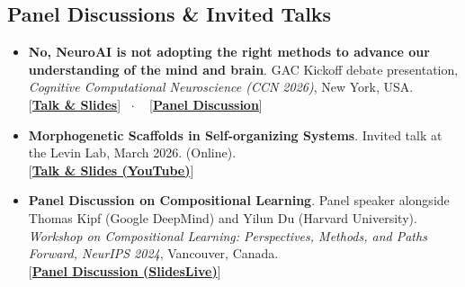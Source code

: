 \documentclass[10pt,a4paper]{article}
\newcommand{\linkbadge}[2]{%
  \textcolor{tagcolor}{[}\href{#2}{\textbf{#1}}\textcolor{tagcolor}{]}%
}
\begin{document}
\subsection*{Panel Discussions \& Invited Talks}
\begin{itemize}[leftmargin=1.6em, itemsep=0.35em]
    \item \textbf{No, NeuroAI is not adopting the right methods to advance our understanding of the mind and brain}. GAC Kickoff debate presentation, \textit{Cognitive Computational Neuroscience (CCN 2026)}, New York, USA. \\
    \linkbadge{Talk \& Slides}{https://youtu.be/kYESqAKLGhA?si=vNGPbsdhHVvX91J8&t=131} \ $\cdot$ \
    \linkbadge{Panel Discussion}{https://youtu.be/kYESqAKLGhA?si=8GGyCruh40tr0-QB&t=2514}

    \item \textbf{Morphogenetic Scaffolds in Self-organizing Systems}. Invited talk at the Levin Lab, March 2026. (Online). \\
    \linkbadge{Talk \& Slides (YouTube)}{https://youtu.be/X9dK7UKBICE?si=zwaakCn40DeKZKt0}

    \item \textbf{Panel Discussion on Compositional Learning}. Panel speaker alongside Thomas Kipf (Google DeepMind) and Yilun Du (Harvard University). \textit{Workshop on Compositional Learning: Perspectives, Methods, and Paths Forward, NeurIPS 2024}, Vancouver, Canada. \\
    \linkbadge{Panel Discussion (SlidesLive)}{https://slideslive.com/39031182/panel-discussion?ref=folder-163258}

\end{itemize}
\end{document}
